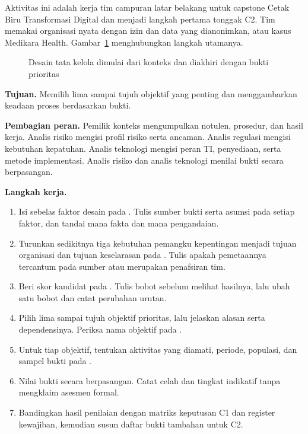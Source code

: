 Aktivitas ini adalah kerja tim campuran latar belakang untuk capstone Cetak Biru Transformasi Digital dan menjadi langkah pertama tonggak C2. Tim memakai organisasi nyata dengan izin dan
data yang dianonimkan, atau kasus Medikara Health. Gambar~\ref{fig:ch04-alur} menghubungkan langkah utamanya.

\begin{figure}[!htb]
  \centering
  
  \caption{Desain tata kelola dimulai dari konteks dan diakhiri dengan bukti prioritas}
  \label{fig:ch04-alur}
\end{figure}

\textbf{Tujuan.} Memilih lima sampai tujuh objektif yang penting dan menggambarkan keadaan proses berdasarkan bukti.

\textbf{Pembagian peran.} Pemilik konteks mengumpulkan notulen, prosedur, dan hasil kerja. Analis risiko mengisi profil risiko serta ancaman. Analis regulasi mengisi kebutuhan kepatuhan.
Analis teknologi mengisi peran TI, penyediaan, serta metode implementasi. Analis risiko dan analis teknologi menilai bukti secara berpasangan.

\textbf{Langkah kerja.}
\begin{enumerate}
  \item Isi sebelas faktor desain pada . Tulis sumber bukti serta asumsi pada setiap faktor, dan tandai mana fakta dan mana pengandaian.
  \item Turunkan sedikitnya tiga kebutuhan pemangku kepentingan menjadi tujuan organisasi dan tujuan keselarasan pada . Tulis apakah pemetaannya
  tercantum pada sumber atau merupakan penafsiran tim.
  \item Beri skor kandidat pada . Tulis bobot sebelum melihat hasilnya, lalu ubah satu bobot dan catat perubahan urutan.
  \item Pilih lima sampai tujuh objektif prioritas, lalu jelaskan alasan serta dependensinya. Periksa nama objektif pada .
  \item Untuk tiap objektif, tentukan aktivitas yang diamati, periode, populasi, dan sampel bukti pada .
  \item Nilai bukti secara berpasangan. Catat celah dan tingkat indikatif tanpa mengklaim asesmen formal.
  \item Bandingkan hasil penilaian dengan matriks keputusan C1 dan register kewajiban, kemudian susun daftar bukti tambahan untuk C2.
\end{enumerate}


